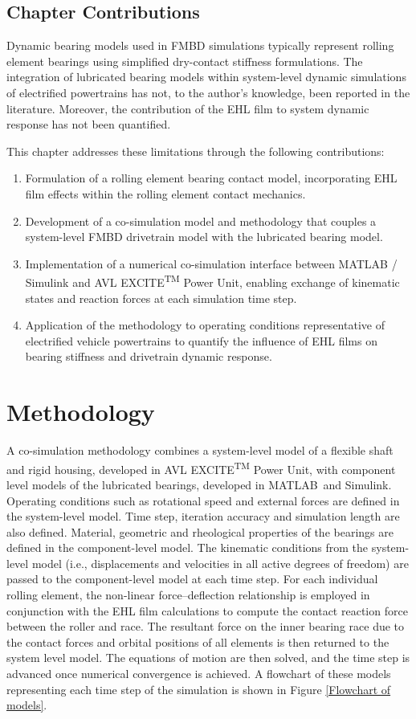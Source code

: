 \subsection{Chapter Contributions}
Dynamic bearing models used in FMBD simulations typically represent rolling element bearings using simplified dry-contact stiffness formulations. The integration of lubricated bearing models within system-level dynamic simulations of electrified powertrains has not, to the author’s knowledge, been reported in the literature. Moreover, the contribution of the EHL film to system dynamic response has not been quantified. 

This chapter addresses these limitations through the following contributions:
\begin{enumerate}
	\item Formulation of a rolling element bearing contact model, incorporating EHL film effects within the rolling element contact mechanics.
	\item Development of a co-simulation model and methodology that couples a system-level FMBD drivetrain model with the lubricated bearing model.
	\item Implementation of a numerical co-simulation interface between MATLAB\textregistered{} / Simulink\textregistered{} and AVL EXCITE\textsuperscript{TM} Power Unit, enabling exchange of kinematic states and reaction forces at each simulation time step.
	\item Application of the methodology to operating conditions representative of electrified vehicle powertrains to quantify the influence of EHL films on bearing stiffness and drivetrain dynamic response.
\end{enumerate}

\section{Methodology}

A co-simulation methodology combines a system-level model of a flexible shaft and rigid housing, developed in AVL EXCITE\textsuperscript{TM} Power Unit, with component level models of the lubricated bearings, developed in MATLAB\textregistered\ and Simulink{\textregistered}. Operating conditions such as rotational speed and external forces are defined in the system-level model. Time step, iteration accuracy and simulation length are also defined. Material, geometric and rheological properties of the bearings are defined in the component-level model. The kinematic conditions from the system-level model (i.e., displacements and velocities in all active degrees of freedom) are passed to the component-level model at each time step. For each individual rolling element, the non-linear force–deflection relationship is employed in conjunction with the EHL film calculations to compute the contact reaction force between the roller and race. The resultant force on the inner bearing race due to the contact forces and orbital positions of all elements is then returned to the system level model. The equations of motion are then solved, and the time step is advanced once numerical convergence is achieved. A flowchart of these models representing each time step of the simulation is shown in Figure \ref{Flowchart of models}.

